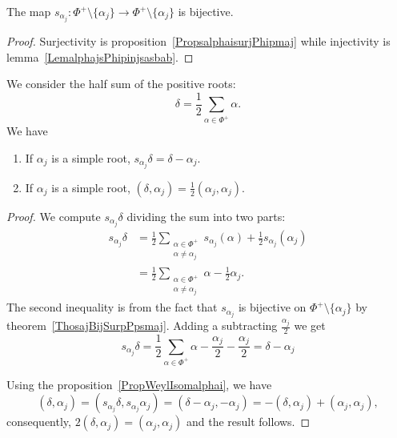 \begin{theorem}      \label{ThosajBijSurpPpsmaj}
	The map \( s_{\alpha_j}\colon \Phi^+\setminus\{ \alpha_j \}\to \Phi^+\setminus\{ \alpha_j \}\) is bijective.
\end{theorem}

\begin{proof}
	Surjectivity is proposition~\ref{PropsalphaisurjPhipmaj} while injectivity is lemma~\ref{LemalphajsPhipinjsasbab}.
\end{proof}

\begin{lemma}
	We consider the half sum of the positive roots:
	\begin{equation}
		\delta=\frac{ 1 }{2}\sum_{\alpha\in\Phi^+}\alpha.
	\end{equation}
	We have
	\begin{enumerate}
		\item
		      If \( \alpha_j\) is a simple root, \( s_{\alpha_j}\delta=\delta-\alpha_j\).
		\item
		      If \( \alpha_j\) is a simple root, \( (\delta,\alpha_j)=\frac{ 1 }{2}(\alpha_j,\alpha_j)\).
	\end{enumerate}
\end{lemma}

\begin{proof}
	We compute \( s_{\alpha_j}\delta\) dividing the sum into two parts:
	\begin{subequations}
		\begin{align}
			s_{\alpha_j}\delta & =\frac{ 1 }{2}\sum_{\substack{\alpha\in\Phi^+ \\\alpha\neq\alpha_j}}s_{\alpha_j}(\alpha)+\frac{ 1 }{2}s_{\alpha_j}(\alpha_j)\\
			                   & =\frac{ 1 }{2}\sum_{\substack{\alpha\in\Phi^+ \\\alpha\neq\alpha_j}}\alpha-\frac{ 1 }{2}\alpha_j.
		\end{align}
	\end{subequations}
	The second inequality is from the fact that \( s_{\alpha_j}\) is bijective on \( \Phi^+\setminus\{ \alpha_j \}\) by theorem~\ref{ThosajBijSurpPpsmaj}. Adding a subtracting \( \frac{ \alpha_j }{2}\) we get
	\begin{equation}
		s_{\alpha_j}\delta=\frac{ 1 }{2}\sum_{\alpha\in\Phi^+}\alpha-\frac{ \alpha_j }{2}-\frac{ \alpha_j }{2}=\delta-\alpha_j
	\end{equation}

	Using the proposition~\ref{PropWeylIsomalphai}, we have
	\begin{equation}
		(\delta,\alpha_j)=(s_{\alpha_j}\delta,s_{\alpha_j}\alpha_j)=(\delta-\alpha_j,-\alpha_j)=-(\delta,\alpha_j)+(\alpha_j,\alpha_j),
	\end{equation}
	consequently, \( 2(\delta,\alpha_j)=(\alpha_j,\alpha_j)\) and the result follows.
\end{proof}

